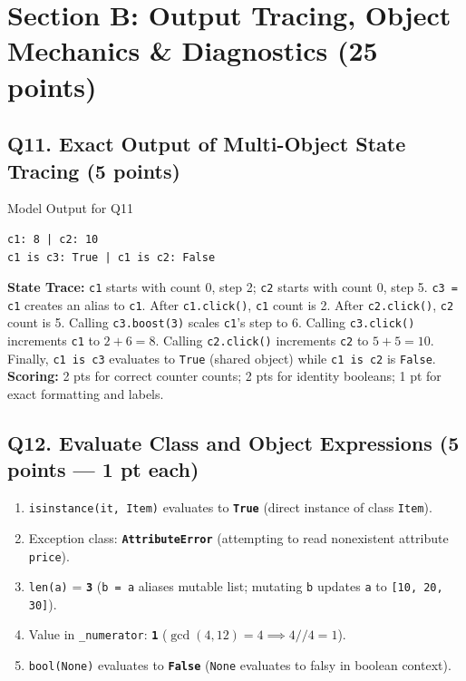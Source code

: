 \documentclass[11pt,a4paper]{article}
\begin{document}
\newpage
\section*{Section B: Output Tracing, Object Mechanics \& Diagnostics (25 points)}

\subsection*{Q11. Exact Output of Multi-Object State Tracing (5 points)}
\begin{solbox}{Model Output for Q11}
\begin{verbatim}
c1: 8 | c2: 10
c1 is c3: True | c1 is c2: False
\end{verbatim}
\end{solbox}
\textbf{State Trace:}
\texttt{c1} starts with count 0, step 2; \texttt{c2} starts with count 0, step 5. \texttt{c3 = c1} creates an alias to \texttt{c1}. After \texttt{c1.click()}, \texttt{c1} count is 2. After \texttt{c2.click()}, \texttt{c2} count is 5. Calling \texttt{c3.boost(3)} scales \texttt{c1}'s step to 6. Calling \texttt{c3.click()} increments \texttt{c1} to $2 + 6 = 8$. Calling \texttt{c2.click()} increments \texttt{c2} to $5 + 5 = 10$. Finally, \texttt{c1 is c3} evaluates to \texttt{True} (shared object) while \texttt{c1 is c2} is \texttt{False}.\newline
\textbf{Scoring:} 2 pts for correct counter counts; 2 pts for identity booleans; 1 pt for exact formatting and labels.

\subsection*{Q12. Evaluate Class and Object Expressions (5 points --- 1 pt each)}
\begin{enumerate}[label=\alph*),itemsep=1.5pt]
\item \texttt{isinstance(it, Item)} evaluates to \textbf{\texttt{True}} (direct instance of class \texttt{Item}).
\item Exception class: \textbf{\texttt{AttributeError}} (attempting to read nonexistent attribute \texttt{price}).
\item \texttt{len(a)} = \textbf{\texttt{3}} (\texttt{b = a} aliases mutable list; mutating \texttt{b} updates \texttt{a} to \texttt{[10, 20, 30]}).
\item Value in \texttt{\_numerator}: \textbf{\texttt{1}} ($\gcd(4, 12) = 4 \implies 4 // 4 = 1$).
\item \texttt{bool(None)} evaluates to \textbf{\texttt{False}} (\texttt{None} evaluates to falsy in boolean context).
\end{enumerate}
\end{document}
